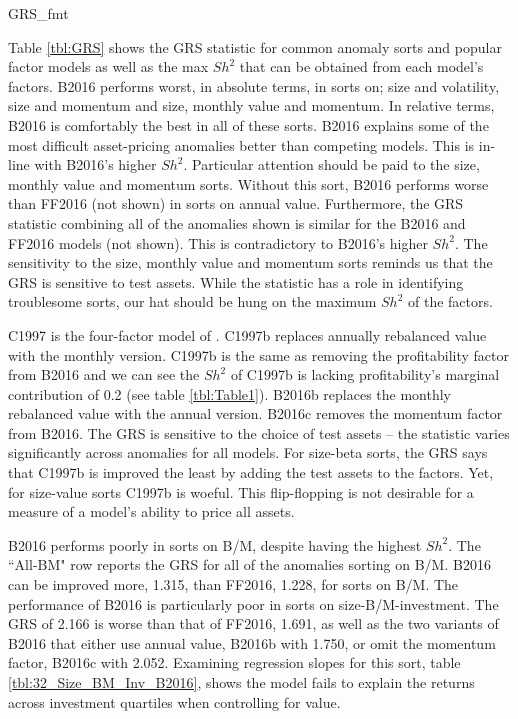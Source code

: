 

{GRS_fmt}

Table \ref{tbl:GRS} shows the GRS statistic for common anomaly sorts and popular factor
models as well as the max $Sh^2$ that can be obtained from each model's factors. B2016
performs worst, in absolute terms, in sorts on; size and volatility, size and momentum and
size, monthly value and momentum. In relative terms, B2016 is comfortably the best in all
of these sorts. B2016 explains some of the most difficult asset-pricing anomalies better
than competing models. This is in-line with B2016's higher $Sh^2$. Particular attention
should be paid to the size, monthly value and momentum sorts. Without this sort, B2016
performs worse than FF2016 (not shown) in sorts on annual value. Furthermore, the GRS
statistic combining all of the anomalies shown is similar for the B2016 and FF2016 models
(not shown). This is contradictory to B2016's higher $Sh^2$. The sensitivity to the size,
monthly value and momentum sorts reminds us that the GRS is sensitive to test assets.
While the statistic has a role in identifying troublesome sorts, our hat should be hung on
the maximum $Sh^2$ of the factors.

C1997 is the four-factor model of \textcite{carhart1997persistence}. C1997b replaces
annually rebalanced value with the monthly version. C1997b is the same as removing the
profitability factor from B2016 and we can see the $Sh^2$ of C1997b is lacking
profitability's marginal contribution of 0.2 (see table \ref{tbl:Table1}). B2016b replaces
the monthly rebalanced value with the annual version. B2016c removes the momentum factor
from B2016. The GRS is sensitive to the choice of test assets -- the statistic varies
significantly across anomalies for all models. For size-beta sorts, the GRS says that
C1997b is improved the least by adding the test assets to the factors. Yet, for size-value
sorts C1997b is woeful. This flip-flopping is not desirable for a measure of a model's
ability to price all assets.

B2016 performs poorly in sorts on B/M, despite having the highest $Sh^2$. The ``All-BM"
row reports the GRS for all of the anomalies sorting on B/M. B2016 can be improved more,
1.315, than FF2016, 1.228, for sorts on B/M. The performance of B2016 is particularly poor
in sorts on size-B/M-investment. The GRS of 2.166 is worse than that of FF2016, 1.691, as
well as the two variants of B2016 that either use annual value, B2016b with 1.750, or omit
the momentum factor, B2016c with 2.052. Examining regression slopes for this sort, table
\ref{tbl:32_Size_BM_Inv_B2016}, shows the model fails to explain the returns across
investment quartiles when controlling for value.

